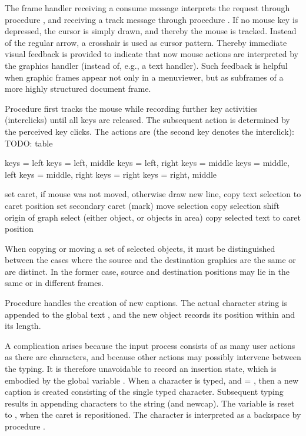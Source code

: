 The frame handler receiving a consume message interprets the request through procedure , and receiving a track message through procedure . If no mouse key is depressed, the cursor is simply drawn, and thereby the mouse is tracked. Instead of the regular arrow, a crosshair is used as cursor pattern. Thereby immediate visual feedback is provided to indicate that now mouse actions are interpreted by the graphics handler (instead of, e.g., a text handler). Such feedback is helpful when graphic frames appear not only in a menuviewer, but as subframes of a more highly structured document frame.

Procedure  first tracks the mouse while recording further key activities (interclicks) until all keys are released. The subsequent action is determined by the perceived key clicks. The actions are (the second key denotes the interclick):
TODO: table

keys = left
keys = left, middle keys = left, right keys = middle
keys = middle, left keys = middle, right keys = right
keys = right, middle

set caret, if mouse was not moved, otherwise draw new line, copy text selection to caret position
set secondary caret (mark)
move selection
copy selection
shift origin of graph
select (either object, or objects in area) copy selected text to caret position

When copying or moving a set of selected objects, it must be distinguished between the cases where the source and the destination graphics are the same or are distinct. In the former case, source and destination positions may lie in the same or in different frames.

Procedure  handles the creation of new captions. The actual character string is appended to the global text , and the new object records its position within  and its length.

A complication arises because the input process consists of as many user actions as there are characters, and because other actions may possibly intervene between the typing. It is therefore unavoidable to record an insertion state, which is embodied by the global variable . When a character is typed, and  = , then a new caption is created consisting of the single typed character. Subsequent typing results in appending characters to the string (and newcap). The variable is reset to , when the caret is repositioned. The  character is interpreted as a backspace by procedure .

